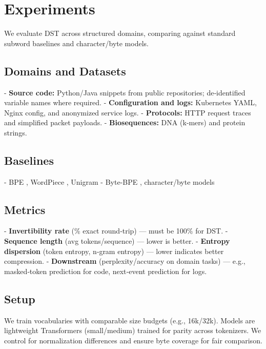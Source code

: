 \section{Experiments}
\label{sec:experiments}

We evaluate DST across structured domains, comparing against standard subword baselines and character/byte models.

\subsection{Domains and Datasets}

- \textbf{Source code:} Python/Java snippets from public repositories; de‑identified variable names where required.
- \textbf{Configuration and logs:} Kubernetes YAML, Nginx config, and anonymized service logs.
- \textbf{Protocols:} HTTP request traces and simplified packet payloads.
- \textbf{Biosequences:} DNA (k‑mers) and protein strings.

\subsection{Baselines}

- BPE \citep{gage1994bpe}, WordPiece \citep{wu2016google}, Unigram \citep{kudo2018sentencepiece}
- Byte‑BPE \citep{radford2019gpt2}, character/byte models \citep{xue2022byt5, clark2022canine}

\subsection{Metrics}

- \textbf{Invertibility rate} (\% exact round‑trip) — must be 100\% for DST.
- \textbf{Sequence length} (avg tokens/sequence) — lower is better.
- \textbf{Entropy dispersion} (token entropy, n‑gram entropy) — lower indicates better compression.
- \textbf{Downstream} (perplexity/accuracy on domain tasks) — e.g., masked‑token prediction for code, next‑event prediction for logs.

\subsection{Setup}

We train vocabularies with comparable size budgets (e.g., 16k/32k). Models are lightweight Transformers (small/medium) trained for parity across tokenizers. We control for normalization differences and ensure byte coverage for fair comparison.

